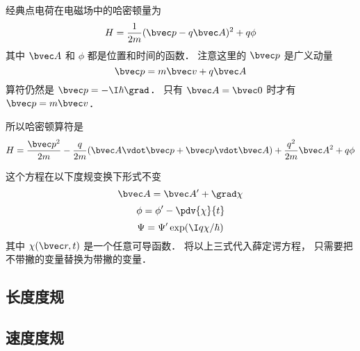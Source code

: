 

经典点电荷在电磁场中的哈密顿量为
\begin{equation}
H = \frac{1}{2m}(\bvec p - q\bvec A)^2 + q\phi
\end{equation}
其中 $\bvec A$ 和 $\phi$ 都是位置和时间的函数． 注意这里的 $\bvec p$ 是广义动量
\begin{equation}
\bvec p = m\bvec v + q\bvec A
\end{equation}
算符仍然是 ${\bvec p} = -\I\hbar\grad$． 只有 $\bvec A = \bvec 0$ 时才有 $\bvec p = m\bvec v$．

所以哈密顿算符是
\begin{equation}
H = \frac{\bvec p^2}{2m} - \frac{q}{2m}(\bvec A\vdot \bvec p + \bvec p \vdot \bvec A) + \frac{q^2}{2m} \bvec A^2 + q\phi
\end{equation}

这个方程在以下度规变换下形式不变
\begin{equation}
\bvec A = \bvec A' + \grad \chi
\end{equation}
\begin{equation}
\phi = \phi' - \pdv{\chi}{t}
\end{equation}
\begin{equation}
\Psi = \Psi' \exp(\I q\chi/\hbar)
\end{equation}
其中 $\chi(\bvec r, t)$ 是一个任意可导函数． 将以上三式代入薛定谔方程， 只需要把不带撇的变量替换为带撇的变量．

\subsection{长度度规}

\subsection{速度度规}
